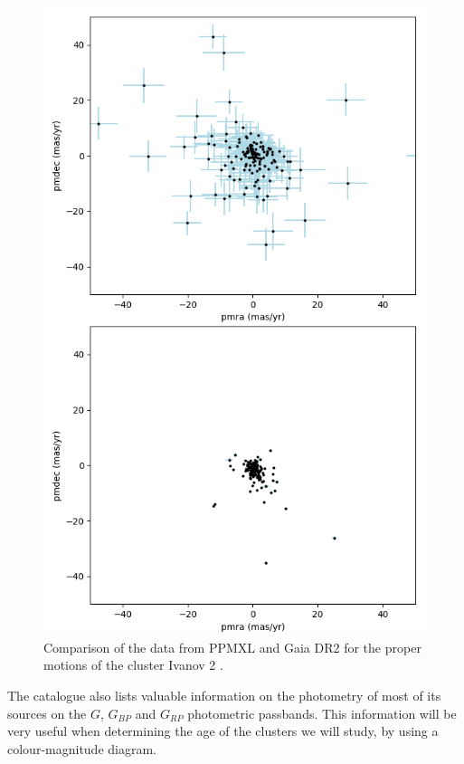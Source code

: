 \documentclass[twocolumn]{revtex4}
\begin{document}
\begin{figure}[h!]
\centering
\includegraphics[scale=0.45]{ppmxl_vs_gaia_motions}
\caption{Comparison of the data from PPMXL and Gaia DR2 for the proper motions of the cluster Ivanov 2 \cite{ivanov}.}
\label{ppmxl_vs_gaiadr2}
\end{figure}


The catalogue also lists valuable information on the photometry of most of its sources on the $G$, $G_{BP}$ and $G_{RP}$ photometric passbands. This information will be very useful when determining the age of the clusters we will study, by using a colour-magnitude diagram.
\end{document}
